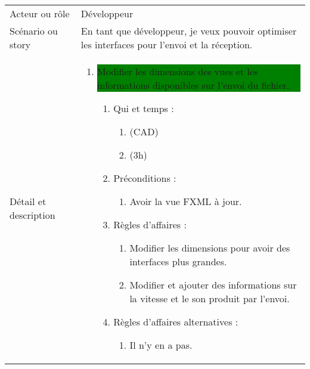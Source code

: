 \begin{longtable}{|l|p{}|}
\hline
    \rowcolor{Gray}
    \multicolumn{2}{|l|}{4} \\
\hline
    Acteur ou rôle & Développeur \\
\hline
    Scénario ou story & En tant que développeur, je veux pouvoir optimiser les interfaces pour l'envoi et la réception. \\
\hline
    Détail et description &
        \begin{enumerate}[label*=\arabic*.]
            \item  \colorbox{Green}{\parbox{13cm}{ Modifier les dimensions des vues et les informations disponibles sur l'envoi du fichier.}}
                \begin{enumerate}[label*=\arabic*.]
                                \item Qui et temps :
                                \begin{enumerate}[label*=\arabic*.]
                                    \item (CAD)
                                    \item (3h)
                                \end{enumerate}
                                \item Préconditions :
                                \begin{enumerate}[label*=\arabic*.]
                                    \item Avoir la vue FXML à jour.
                                \end{enumerate}
                                \item Règles d'affaires :
                                \begin{enumerate}[label*=\arabic*.]
                                    \item Modifier les dimensions pour avoir des interfaces plus grandes.
                                    \item Modifier et ajouter des informations sur la vitesse et le son produit par l'envoi.
                                \end{enumerate}
                                \item Règles d'affaires alternatives :
                                \begin{enumerate}[label*=\arabic*.]
                                    \item Il n'y en a pas.
                                \end{enumerate}

\end{enumerate}
\end{enumerate}
\end{longtable}
